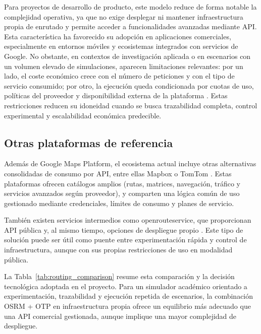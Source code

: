 Para proyectos de desarrollo de producto, este modelo reduce de forma notable la complejidad operativa, ya que no exige desplegar ni mantener infraestructura propia de enrutado y permite acceder a funcionalidades avanzadas mediante API. Esta característica ha favorecido su adopción en aplicaciones comerciales, especialmente en entornos móviles y ecosistemas integrados con servicios de Google. No obstante, en contextos de investigación aplicada o en escenarios con un volumen elevado de simulaciones, aparecen limitaciones relevantes: por un lado, el coste económico crece con el número de peticiones y con el tipo de servicio consumido; por otro, la ejecución queda condicionada por cuotas de uso, políticas del proveedor y disponibilidad externa de la plataforma \cite{GoogleMapsPricing}. Estas restricciones reducen su idoneidad cuando se busca trazabilidad completa, control experimental y escalabilidad económica predecible.

\subsection{Otras plataformas de referencia}

Además de Google Maps Platform, el ecosistema actual incluye otras alternativas consolidadas de consumo por API, entre ellas Mapbox \cite{MapboxDirectionsAPI} o TomTom \cite{TomTomRoutingAPI}. Estas plataformas ofrecen catálogos amplios (rutas, matrices, navegación, tráfico y servicios avanzados según proveedor), y comparten una lógica común de uso gestionado mediante credenciales, límites de consumo y planes de servicio.

También existen servicios intermedios como openrouteservice, que proporcionan API pública y, al mismo tiempo, opciones de despliegue propio \cite{OpenRouteServiceAPI,OpenRouteServiceRestrictions}. Este tipo de solución puede ser útil como puente entre experimentación rápida y control de infraestructura, aunque con sus propias restricciones de uso en modalidad pública.

La Tabla~\ref{tab:routing_comparison} resume esta comparación y la decisión tecnológica adoptada en el proyecto. Para un simulador académico orientado a experimentación, trazabilidad y ejecución repetida de escenarios, la combinación OSRM + OTP en infraestructura propia ofrece un equilibrio más adecuado que una API comercial gestionada, aunque implique una mayor complejidad de despliegue.

